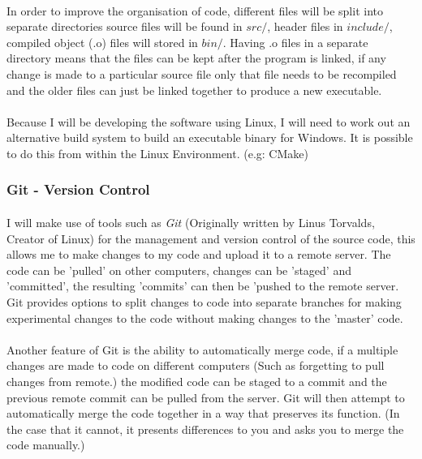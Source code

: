 \paragraph{}
In order to improve the organisation of code, different files will be split into separate directories source files will be found in $src/$, header files in $include/$, compiled object (.o) files will stored in $bin/$.
Having .o files in a separate directory means that the files can be kept after the program is linked, if any change is made to a particular source file only that file needs to be recompiled and the older files can just be linked together to produce a new executable.

\paragraph{}
Because I will be developing the software using Linux, I will need to work out an alternative build system to build an executable binary for Windows. It is possible to do this from within the Linux Environment. (e.g: CMake)

\subsubsection{Git - Version Control}
\paragraph{}
I will make use of tools such as \textit{Git} (Originally written by Linus Torvalds, Creator of Linux) for the management and version control of the source code, this allows me to make changes to my code and upload it to a remote server. The code can be 'pulled' on other computers, changes can be 'staged' and 'committed', the resulting 'commits' can then be 'pushed to the remote server. Git provides options to split changes to code into separate branches for making experimental changes to the code without making changes to the 'master' code.

\paragraph{}
Another feature of Git is the ability to automatically merge code, if a multiple changes are made to code on different computers (Such as forgetting to pull changes from remote.) the modified code can be staged to a commit and the previous remote commit can be pulled from the server. Git will then attempt to automatically merge the code together in a way that preserves its function. (In the case that it cannot, it presents differences to you and asks you to merge the code manually.)

